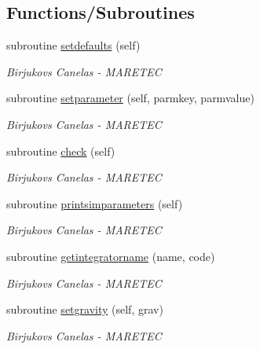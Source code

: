 \subsection*{Functions/\+Subroutines}
\begin{DoxyCompactItemize}
\item 
subroutine \hyperlink{namespacesimulation__globals__mod_ac2ac06271de377004c67b6ba2f3ed353}{setdefaults} (self)
\begin{DoxyCompactList}\small\item\em Birjukovs Canelas -\/ M\+A\+R\+E\+T\+EC \end{DoxyCompactList}\item 
subroutine \hyperlink{namespacesimulation__globals__mod_a8a05831d4c3e3eb5741d65978f6fcf61}{setparameter} (self, parmkey, parmvalue)
\begin{DoxyCompactList}\small\item\em Birjukovs Canelas -\/ M\+A\+R\+E\+T\+EC \end{DoxyCompactList}\item 
subroutine \hyperlink{namespacesimulation__globals__mod_a41249abb5c33ef9e8bff448f0b3826fa}{check} (self)
\begin{DoxyCompactList}\small\item\em Birjukovs Canelas -\/ M\+A\+R\+E\+T\+EC \end{DoxyCompactList}\item 
subroutine \hyperlink{namespacesimulation__globals__mod_a97c04d0289a9f2d004a9329cb7ab16f0}{printsimparameters} (self)
\begin{DoxyCompactList}\small\item\em Birjukovs Canelas -\/ M\+A\+R\+E\+T\+EC \end{DoxyCompactList}\item 
subroutine \hyperlink{namespacesimulation__globals__mod_a68e871ed8e5d3930884e968c6fdafddc}{getintegratorname} (name, code)
\begin{DoxyCompactList}\small\item\em Birjukovs Canelas -\/ M\+A\+R\+E\+T\+EC \end{DoxyCompactList}\item 
subroutine \hyperlink{namespacesimulation__globals__mod_a9e92dfed4ef7388208adce768f064554}{setgravity} (self, grav)
\begin{DoxyCompactList}\small\item\em Birjukovs Canelas -\/ M\+A\+R\+E\+T\+EC \end{DoxyCompactList}\item 

\end{DoxyCompactItemize}
